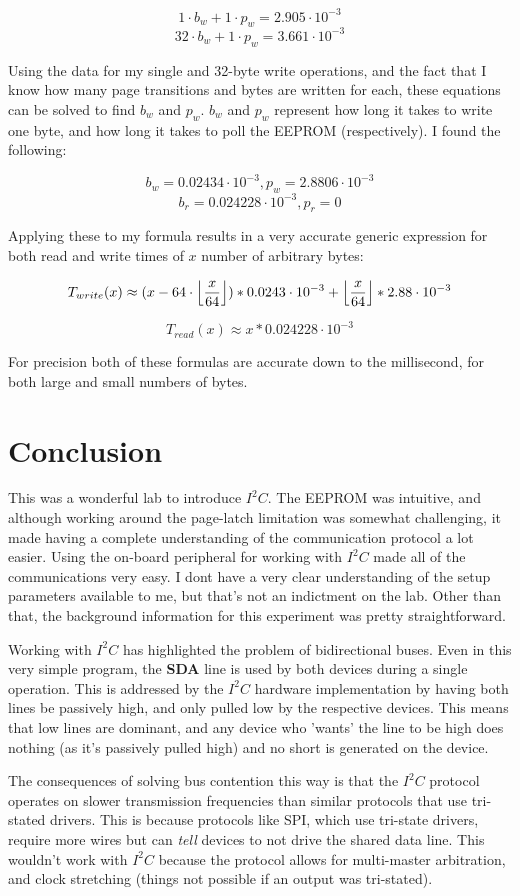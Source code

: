 \documentclass[a4paper, 12pt]{article}
\DeclarePairedDelimiter\floor{\lfloor}{\rfloor}
\begin{document}
$$1\cdot b_w + 1\cdot p_w= 2.905\cdot 10^{-3}$$
$$32\cdot b_w + 1\cdot p_w = 3.661\cdot 10^{-3}$$

Using the data for my single and 32-byte write operations, and the fact that I know how many page transitions and bytes are written for each, these equations can be solved to find $b_w$ and $p_w$. $b_w$ and $p_w$ represent how long it takes to write one byte, and how long it takes to poll the EEPROM (respectively). I found the following:

$$b_w=0.02434\cdot 10^{-3}, p_w=2.8806\cdot 10^{-3}$$
$$b_r=0.024228\cdot 10^{-3}, p_r=0$$

Applying these to my formula results in a very accurate generic expression for both read and write times of $x$ number of arbitrary bytes:

$$T_{write}(x)\approx (x-64\cdot\floor*{\frac{x}{64}})*0.0243\cdot 10^{-3} + \floor*{\frac{x}{64}}*2.88\cdot 10^{-3}$$

$$T_{read}(x)\approx x * 0.024228\cdot 10^{-3}$$

For precision both of these formulas are accurate down to the millisecond, for both large and small numbers of bytes.
 
\section{Conclusion}
This was a wonderful lab to introduce $I^2C$. The EEPROM was intuitive, and although working around the page-latch limitation was somewhat challenging, it made having a complete understanding of the communication protocol a lot easier. Using the on-board peripheral for working with $I^2C$ made all of the communications very easy. I dont have a very clear understanding of the setup parameters available to me, but that's not an indictment on the lab. Other than that, the background information for this experiment was pretty straightforward.

Working with $I^2C$ has highlighted the problem of bidirectional buses. Even in this very simple program, the \textbf{SDA} line is used by both devices during a single operation. This is addressed by the $I^2C$ hardware implementation by having both lines be passively high, and only pulled low by the respective devices. This means that low lines are dominant, and any device who 'wants' the line to be high does nothing (as it's passively pulled high) and no short is generated on the device.

The consequences of solving bus contention this way is that the $I^2C$ protocol operates on slower transmission frequencies than similar protocols that use tri-stated drivers. This is because protocols like SPI, which use tri-state drivers, require more wires but can \textit{tell} devices to not drive the shared data line. This wouldn't work with $I^2C$ because the protocol allows for multi-master arbitration, and clock stretching (things not possible if an output was tri-stated).
\end{document}
